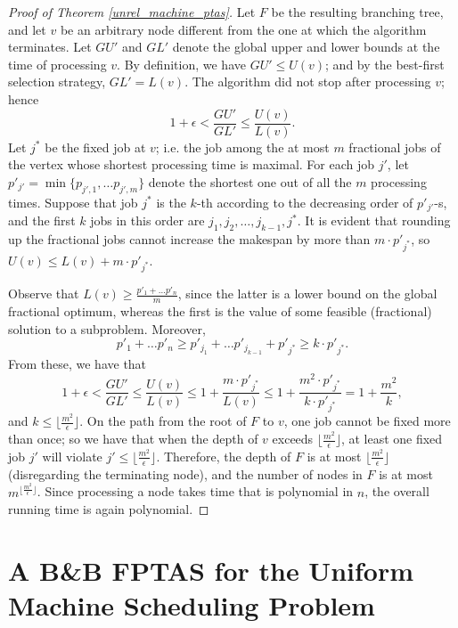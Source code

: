 \documentclass[a4paper,UKenglish,cleveref, autoref, thm-restate, pdfa]{lipics-v2021}
\theoremstyle{plain}
\begin{document}
\begin{proof}[Proof of Theorem \ref{unrel_machine_ptas}]
    Let $F$ be the resulting branching tree, and let $v$ be an arbitrary node different from the one at which the algorithm terminates. Let $GU'$ and $GL'$ denote the global upper and lower bounds at the time of processing $v$. By definition, we have $GU' \le U(v)$; and by the best-first selection strategy, $GL'=L(v)$. The algorithm did not stop after processing $v$; hence
    \[
    1+\epsilon < \frac{GU'}{GL'}\le \frac{U(v)}{L(v)}.
    \]
    Let $j^*$ be the fixed job at $v$; i.e. the job among the at most $m$ fractional jobs of the vertex whose shortest processing time is maximal. For each job $j'$, let $p'_{j'} = \min\{p_{j',1}, \ldots p_{j', m}\}$ denote the shortest one out of all the $m$ processing times. Suppose that job $j^*$ is the $k$-th according to the decreasing order of $p'_{j'}$-s, and the first $k$ jobs in this order are $j_1, j_2, \ldots, j_{k-1}, j^*$. It is evident that rounding up the fractional jobs cannot increase the makespan by more than $m\cdot p'_{j^*}$, so $U(v)\le L(v)+m\cdot p'_{j^*}$.

    Observe that $L(v) \ge \frac{p'_1 + \ldots p'_n}{m}$, since the latter is a lower bound on the global fractional optimum, whereas the first is the value of some feasible (fractional) solution to a subproblem. Moreover,
    \[
    p'_1 + \ldots p'_n \ge p'_{j_1} + \ldots p'_{j_{k-1}} + p'_{j^*} \ge k \cdot p'_{j^*}.
    \]
    From these, we have that
    \begin{equation}
        1+\epsilon < \frac{GU'}{GL'}\le \frac{U(v)}{L(v)} \le 1+\frac{m\cdot p'_{j^*}}{L(v)} \le1+ \frac{m^2\cdot p'_{j^*}}{k\cdot p'_{j^*}}= 1 + \frac{m^2}{k},
    \end{equation}
    and $k \le \lfloor \frac{m^2}{\epsilon}\rfloor$. On the path from the root of $F$ to $v$, one job cannot be fixed more than once; so we have that when the depth of $v$ exceeds $\lfloor\frac{m^2}{\epsilon} \rfloor$, at least one fixed job $j'$ will violate $j' \le \lfloor\frac{m^2}{\epsilon}\rfloor$. Therefore, the depth of $F$ is at most $\lfloor\frac{m^2}{\epsilon}\rfloor$ (disregarding the terminating node), and the number of nodes in $F$ is at most $m^{\lfloor\frac{m^2}{\epsilon}\rfloor}$. Since processing a node takes time that is polynomial in $n$, the overall running time is again polynomial.
\end{proof}
 
\section{A B\&B FPTAS for the Uniform Machine Scheduling Problem}\label{sec:js:fptas}
\end{document}
